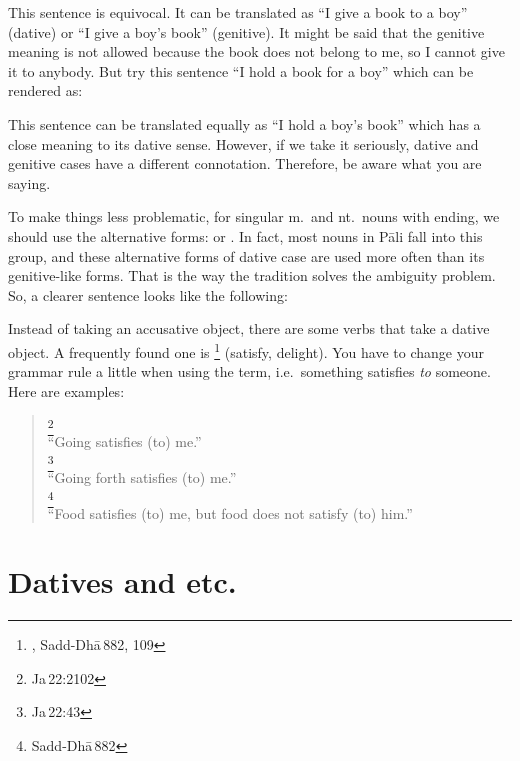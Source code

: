 This sentence is equivocal. It can be translated as ``I give a book to a boy'' (dative) or ``I give a boy's book'' (genitive). It might be said that the genitive meaning is not allowed because the book does not belong to me, so I cannot give it to anybody. But try this sentence ``I hold a book for a boy'' which can be rendered as:


This sentence can be translated equally as ``I hold a boy's book'' which has a close meaning to its dative sense. However, if we take it seriously, dative and genitive cases have a different connotation. Therefore, be aware what you are saying.

To make things less problematic, for singular m.\ and nt.\ nouns with  ending, we should use the alternative forms:  or . In fact, most nouns in P\=ali fall into this group, and these alternative forms of dative case are used more often than its genitive-like forms. That is the way the tradition solves the ambiguity problem. So, a clearer sentence looks like the following:


Instead of taking an accusative object, there are some verbs that take a dative object. A frequently found one is \footnote{, Sadd-Dh\=a\,882, 109} (satisfy, delight). You have to change your grammar rule a little when using the term, i.e.\ something satisfies \emph{to} someone. Here are examples:

\begin{quote}
\footnote{Ja\,22:2102} \\
``Going satisfies (to) me.'' \\[1.5mm]
\footnote{Ja\,22:43} \\
``Going forth satisfies (to) me.'' \\[1.5mm]
\footnote{Sadd-Dh\=a\,882} \\
``Food satisfies (to) me, but food does not satisfy (to) him.''
\end{quote}

{}
\section*{Datives and  etc.}

